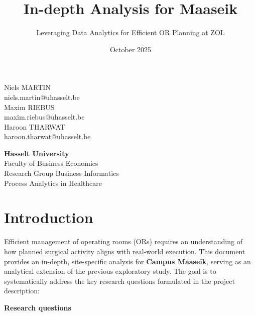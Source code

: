 \documentclass[
]{article}
\title{In-depth Analysis for Maaseik}
\subtitle{Leveraging Data Analytics for Efficient OR Planning at ZOL}
\author{}
\date{\vspace{-2.5em}October 2025}
\begin{document}
\maketitle

\begin{center}
\vspace{2cm}

Niels MARTIN\\
niels.martin@uhasselt.be\\[0.5em]
Maxim RIEBUS\\
maxim.riebus@uhasselt.be\\[0.5em]
Haroon THARWAT\\
haroon.tharwat@uhasselt.be\\

\vspace{6cm}

\textbf{Hasselt University} \\
Faculty of Business Economics \\
Research Group Business Informatics \\
Process Analytics in Healthcare
\end{center}

\newpage
\tableofcontents
\newpage

\section{Introduction}\label{introduction}

Efficient management of operating rooms (ORs) requires an understanding
of how planned surgical activity aligns with real-world execution. This
document provides an in-depth, site-specific analysis for \textbf{Campus
Maaseik}, serving as an analytical extension of the previous exploratory
study. The goal is to systematically address the key research questions
formulated in the project description:

\textbf{Research questions}
\end{document}
